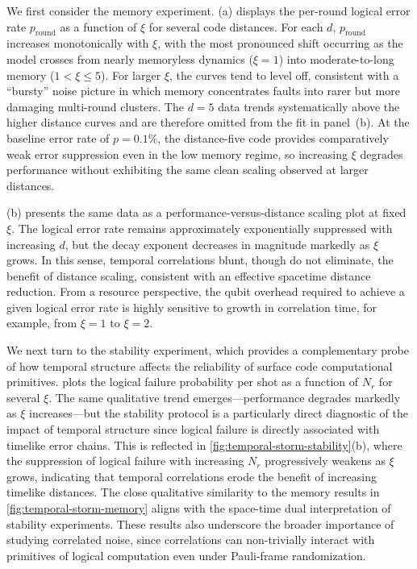 \documentclass[
    aps,
    prx,
    reprint,
    superscriptaddress,
    longbibliography,
    nofootinbib,
    floatfix,
]{revtex4-2}
\begin{document}
We first consider the memory experiment. (a) displays the per-round logical error rate \(p_\mathrm{round}\) as a function of \(\xi\) for several code distances. For each \(d\), \(p_\mathrm{round}\) increases monotonically with \(\xi\), with the most pronounced shift occurring as the model crosses from nearly memoryless dynamics (\(\xi = 1\)) into moderate-to-long memory (\(1 < \xi \le 5\)). For larger \(\xi\), the curves tend to level off, consistent with a ``bursty'' noise picture in which memory concentrates faults into rarer but more damaging multi-round clusters. The \(d = 5\) data trends systematically above the higher distance curves and are therefore omitted from the fit in panel~(b). At the baseline error rate of \(p=0.1\%\), the distance-five code provides comparatively weak error suppression even in the low memory regime, so increasing \(\xi\) degrades performance without exhibiting the same clean scaling observed at larger distances.

(b) presents the same data as a performance-versus-distance scaling plot at fixed \(\xi\). The logical error rate remains approximately exponentially suppressed with increasing \(d\), but the decay exponent decreases in magnitude markedly as \(\xi\) grows. In this sense, temporal correlations blunt, though do not eliminate, the benefit of distance scaling, consistent with an effective spacetime distance reduction. From a resource perspective, the qubit overhead required to achieve a given logical error rate is highly sensitive to growth in correlation time, for example, from \(\xi=1\) to \(\xi=2\).

We next turn to the stability experiment, which provides a complementary probe of how temporal structure affects the reliability of surface code computational primitives.  plots the logical failure probability per shot as a function of \(N_r\) for several \(\xi\). The same qualitative trend emerges---performance degrades markedly as \(\xi\) increases---but the stability protocol is a particularly direct diagnostic of the impact of temporal structure since logical failure is directly associated with timelike error chains. This is reflected in \cref{fig:temporal-storm-stability}(b), where the suppression of logical failure with increasing \(N_r\) progressively weakens as \(\xi\) grows, indicating that temporal correlations erode the benefit of increasing timelike distances. The close qualitative similarity to the memory results in \cref{fig:temporal-storm-memory} aligns with the space-time dual interpretation of stability experiments. These results also underscore the broader importance of studying correlated noise, since correlations can non-trivially interact with primitives of logical computation even under Pauli-frame randomization.
\end{document}
